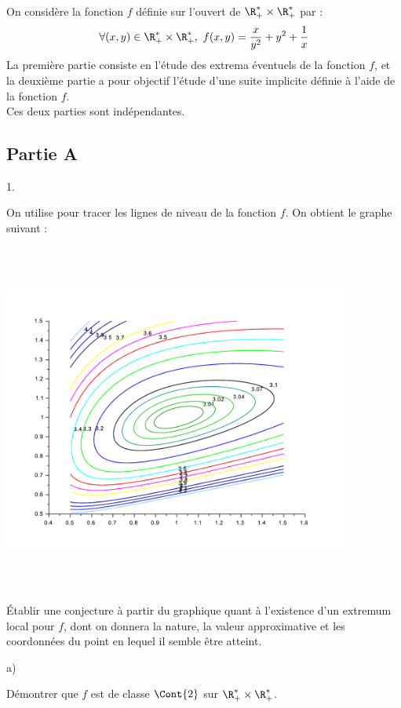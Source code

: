 \documentclass[11pt]{article}%
\begin{document}
\noindent
On considère la fonction $f$ définie sur l'ouvert de $\R_+^{*} \times
\R_+^{*}$ par :
\[
\forall (x,y) \in \R_+^{*} \times \R_+^{*}, \ f(x,y) = \dfrac{x}{y^2}
+ y^2 + \dfrac{1}{x}
\]
La première partie consiste en l'étude des extrema éventuels de la
fonction $f$, et la deuxième partie a pour objectif l'étude d'une
suite implicite définie à l'aide de la fonction $f$.\\
Ces deux parties sont indépendantes.

\subsection*{Partie A}

\begin{noliste}{1.}
  \setlength{\itemsep}{4mm}
\item On utilise \Scilab{} pour tracer les lignes de niveau de la
  fonction $f$. On obtient le graphe suivant :~\\[-.4cm]
  \begin{center}
    \includegraphics[width=11.5cm,height=11.5cm]{../Figures/ECRICOME_2019/Ecricome_2019_figure1.pdf}
  \end{center}
  Établir une conjecture à partir du graphique quant à l'existence
  d'un extremum local pour $f$, dont on donnera la nature, la valeur
  approximative et les coordonnées du point en lequel il semble être
  atteint.
  
\item
  \begin{noliste}{a)}
    \setlength{\itemsep}{2mm}
  \item Démontrer que $f$ est de classe $\Cont{2}$ sur $\R_+^{*}
    \times \R_+^{*}$.
    

\end{noliste}
\end{noliste}
\end{document}
